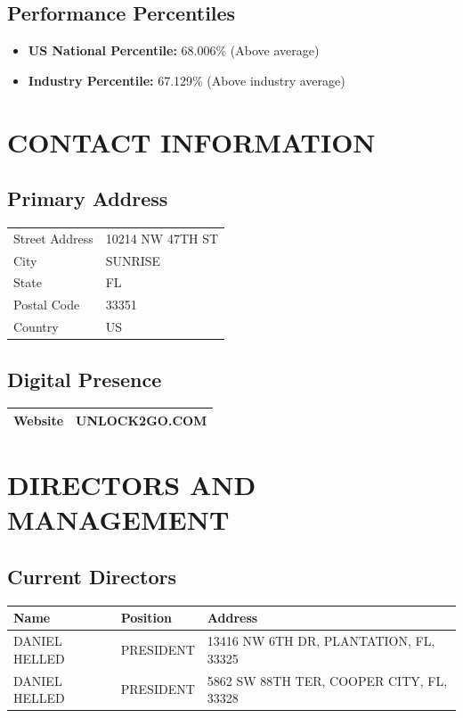 \documentclass[11pt,a4paper]{article}
\begin{document}
\subsection{Performance Percentiles}
\begin{itemize}
    \item \textbf{US National Percentile:} 68.006\% (Above average)
    \item \textbf{Industry Percentile:} 67.129\% (Above industry average)
\end{itemize}

\section{CONTACT INFORMATION}

\subsection{Primary Address}
\begin{tabularx}{\textwidth}{|l|X|}
\hline
\rowcolor{lightgray}
\multicolumn{2}{|c|}{\textbf{BUSINESS ADDRESS}} \\
\hline
Street Address & 10214 NW 47TH ST \\
\hline
City & SUNRISE \\
\hline
State & FL \\
\hline
Postal Code & 33351 \\
\hline
Country & US \\
\hline
\end{tabularx}

\subsection{Digital Presence}
\begin{tabularx}{\textwidth}{|l|X|}
\hline
Website & UNLOCK2GO.COM \\
\hline
\end{tabularx}

\section{DIRECTORS AND MANAGEMENT}

\subsection{Current Directors}
\begin{longtable}{|p{3cm}|p{4cm}|p{7cm}|}
\hline
\rowcolor{lightgray}
\textbf{Name} & \textbf{Position} & \textbf{Address} \\
\hline
\endhead
DANIEL HELLED & PRESIDENT & 13416 NW 6TH DR, PLANTATION, FL, 33325 \\
\hline
DANIEL HELLED & PRESIDENT & 5862 SW 88TH TER, COOPER CITY, FL, 33328 \\
\hline

\end{longtable}
\end{document}
